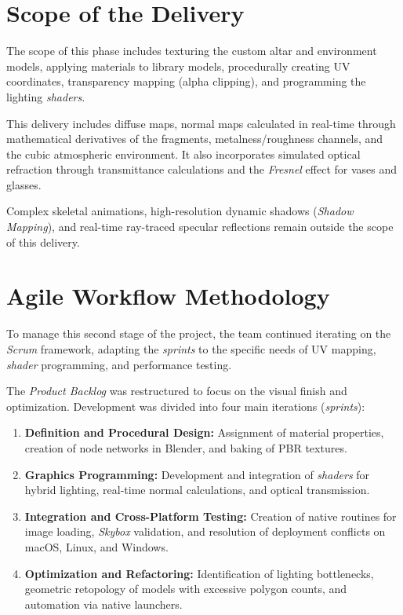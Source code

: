 \documentclass[letter,11pt]{article}
\begin{document}
	\section{Scope of the Delivery}
	The scope of this phase includes texturing the custom altar and environment models, applying materials to library models, procedurally creating UV coordinates, transparency mapping (alpha clipping), and programming the lighting \textit{shaders}.
	
	This delivery includes diffuse maps, normal maps calculated in real-time through mathematical derivatives of the fragments, metalness/roughness channels, and the cubic atmospheric environment. It also incorporates simulated optical refraction through transmittance calculations and the \textit{Fresnel} effect for vases and glasses.
	
	Complex skeletal animations, high-resolution dynamic shadows (\textit{Shadow Mapping}), and real-time ray-traced specular reflections remain outside the scope of this delivery.
	
	\section{Agile Workflow Methodology}
	To manage this second stage of the project, the team continued iterating on the \textit{Scrum} framework, adapting the \textit{sprints} to the specific needs of UV mapping, \textit{shader} programming, and performance testing.
	
	The \textit{Product Backlog} was restructured to focus on the visual finish and optimization. Development was divided into four main iterations (\textit{sprints}):
	\begin{enumerate}[leftmargin=*]
		\item \textbf{Definition and Procedural Design:} Assignment of material properties, creation of node networks in Blender, and baking of PBR textures.
		\item \textbf{Graphics Programming:} Development and integration of \textit{shaders} for hybrid lighting, real-time normal calculations, and optical transmission.
		\item \textbf{Integration and Cross-Platform Testing:} Creation of native routines for image loading, \textit{Skybox} validation, and resolution of deployment conflicts on macOS, Linux, and Windows.
		\item \textbf{Optimization and Refactoring:} Identification of lighting bottlenecks, geometric retopology of models with excessive polygon counts, and automation via native launchers.
	\end{enumerate}
	
\end{document}
